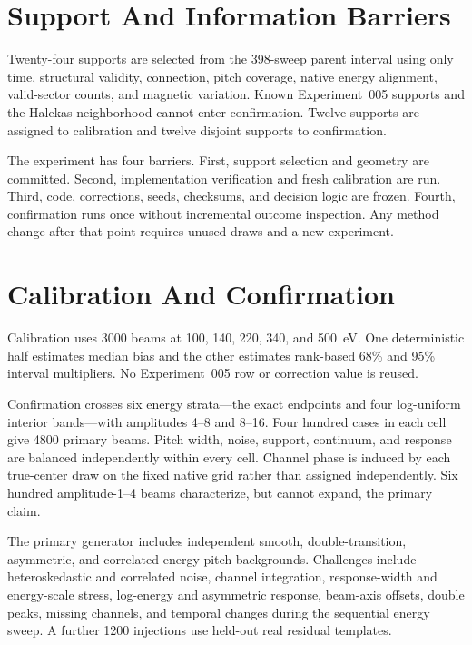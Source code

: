 \documentclass[11pt]{article}
\begin{document}
\section{Support And Information Barriers}

Twenty-four supports are selected from the 398-sweep parent interval using only
time, structural validity, connection, pitch coverage, native energy alignment,
valid-sector counts, and magnetic variation.  Known Experiment~005 supports
and the Halekas neighborhood cannot enter confirmation.  Twelve supports are
assigned to calibration and twelve disjoint supports to confirmation.

The experiment has four barriers.  First, support selection and geometry are
committed.  Second, implementation verification and fresh calibration are run.
Third, code, corrections, seeds, checksums, and decision logic are frozen.
Fourth, confirmation runs once without incremental outcome inspection.  Any
method change after that point requires unused draws and a new experiment.

\section{Calibration And Confirmation}

Calibration uses 3000 beams at 100, 140, 220, 340, and 500~eV.  One
deterministic half estimates median bias and the other estimates rank-based 68\%
and 95\% interval multipliers.  No Experiment~005 row or correction value is
reused.

Confirmation crosses six energy strata---the exact endpoints and four
log-uniform interior bands---with amplitudes 4--8 and 8--16.  Four hundred
cases in each cell give 4800 primary beams.  Pitch width, noise, support,
continuum, and response are balanced independently within every cell.  Channel
phase is induced by each true-center draw on the fixed native grid rather than
assigned independently.  Six hundred amplitude-1--4 beams characterize, but
cannot expand, the primary claim.

The primary generator includes independent smooth, double-transition,
asymmetric, and correlated energy-pitch backgrounds.  Challenges include
heteroskedastic and correlated noise, channel integration, response-width and
energy-scale stress, log-energy and asymmetric response, beam-axis offsets,
double peaks, missing channels, and temporal changes during the sequential
energy sweep.  A further 1200 injections use held-out real residual templates.
\end{document}
